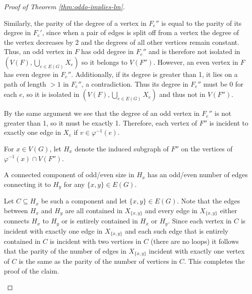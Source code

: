 \documentclass[11pt]{article}
\begin{document}
\begin{proof}[Proof of Theorem \ref{thm:oddo-implies-lm}]
\begin{proofofclaim}
        Similarly, the parity of the degree of a vertex in $F_e''$ is equal to the parity of its degree in $F_e'$, since when a pair of edges is split off from a vertex the degree of the vertex decreases by 2 and the degrees of all other vertices remain constant.
        Thus, an odd vertex in $F$ has odd degree in $F_e''$ and is therefore not isolated in $(V(F), \bigcup_{e \in E(G)} X_e)$ so it belongs to $V(F'')$.
        However, an even vertex in $F$ has even degree in $F_e''$. Additionally, if its degree is greater than 1, it lies on a path of length $>1$ in $F_e''$, a contradiction. Thus its degree in $F_e''$ must be 0 for each $e$, so it is isolated in $(V(F), \bigcup_{e \in E(G)} X_e)$ and thus not in $V(F'')$.
        \par 
        By the same argument we see that the degree of an odd vertex in $F_e''$ is not greater than 1, so it must be exactly 1. Therefore, each vertex of $F''$ is incident to exactly one edge in $X_e$ if $v \in \varphi^{-1}(e)$.
    \end{proofofclaim}
    For $x \in V(G)$, let $H_x$ denote the induced subgraph of $F''$ on the vertices of $\varphi^{-1}(x) \cap V(F'')$.
    \begin{claim}
    \label{claim:odd-even-components}
        A connected component of odd/even size in $H_x$ has an odd/even number of edges connecting it to $H_y$ for any $\{x,y\} \in E(G)$.
    \end{claim}
    \begin{proofofclaim}
        Let $C\subseteq H_x$ be such a component and let $\{x,y \} \in E(G)$. Note that the edges between $H_x$ and $H_y$ are all contained in $X_{\{x,y\}}$ and every edge in $X_{\{x,y\}}$ either connects $H_x$ to $H_y$ or is entirely contained in $H_x$ or $H_y$. 
        Since each vertex in $C$ is incident with exactly one edge in $X_{\{x,y\}}$ and each such edge that is entirely contained in $C$ is incident with two vertices in $C$ (there are no loops) it follows that the parity of the number of edges in $X_{\{x,y\}}$ incident with exactly one vertex of $C$ is the same as the parity of the number of vertices in $C$. This completes the proof of the claim.
    \end{proofofclaim}


\end{proof}
\end{document}
